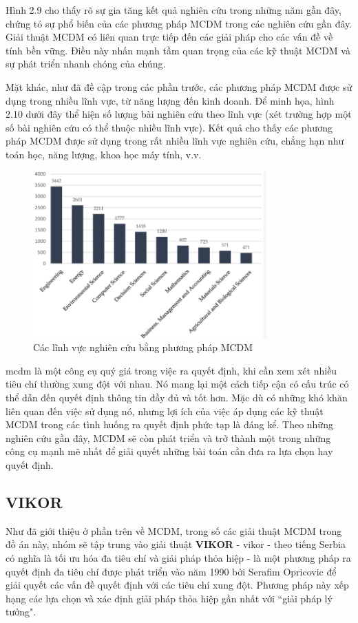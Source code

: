 Hình 2.9 cho thấy rõ sự gia tăng kết quả nghiên cứu trong những năm gần đây, chứng tỏ sự phổ biến của các phương pháp MCDM trong các nghiên cứu gần đây. Giải thuật MCDM có liên quan trực tiếp đến các giải pháp cho các vấn đề về tính bền vững. Điều này nhấn mạnh tầm quan trọng của các kỹ thuật MCDM và sự phát triển nhanh chóng của chúng. 

Mặt khác, như đã đề cập trong các phần trước, các phương pháp MCDM được sử dụng trong nhiều lĩnh vực, từ năng lượng đến kinh doanh. Để minh họa, hình 2.10 dưới đây thể hiện số lượng bài nghiên cứu theo lĩnh vực (xét trường hợp một số bài nghiên cứu có thể thuộc nhiều lĩnh vực). Kết quả cho thấy các phương pháp MCDM được sử dụng trong rất nhiều lĩnh vực nghiên cứu, chẳng hạn như toán học, năng lượng, khoa học máy tính, v.v.
\begin{figure}[H]
    \centering
    \includegraphics[width=0.8\textwidth]{images/chap2/MCDMarea.png}
    \vspace{0.5cm}
    \caption{Các lĩnh vực nghiên cứu bằng phương pháp MCDM}
\end{figure}

\acrshort{mcdm} là một công cụ quý giá trong việc ra quyết định, khi cần xem xét nhiều tiêu chí thường xung đột với nhau. Nó mang lại một cách tiếp cận có cấu trúc có thể dẫn đến quyết định thông tin đầy đủ và tốt hơn. Mặc dù có những khó khăn liên quan đến việc sử dụng nó, nhưng lợi ích của việc áp dụng các kỹ thuật MCDM trong các tình huống ra quyết định phức tạp là đáng kể. Theo những nghiên cứu gần đây, MCDM sẽ còn phát triển và trở thành một trong những công cụ mạnh mẽ nhất để giải quyết những bài toán cần đưa ra lựa chọn hay quyết định.

\subsection{VIKOR}
Như đã giới thiệu ở phần trên về MCDM, trong số các giải thuật MCDM trong đồ án này, nhóm sẽ tập trung vào giải thuật \textbf{VIKOR} - \acrlong{vikor} - theo tiếng Serbia có nghĩa là tối ưu hóa đa tiêu chí và giải pháp thỏa hiệp - là một phương pháp ra quyết định đa tiêu chí được phát triển vào năm 1990 bởi Serafim Opricovic để giải quyết các vấn đề quyết định với các tiêu chí xung đột. Phương pháp này xếp hạng các lựa chọn và xác định giải pháp thỏa hiệp gần nhất với ``giải pháp lý tưởng".

